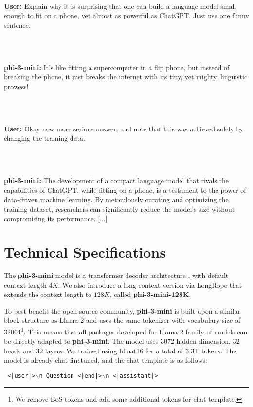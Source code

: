 \begin{AIbox}{}
\tt \footnotesize 
\begin{minipage}[t]{0.99\linewidth}
\textbf{User:} Explain why it is surprising that one can build a language model small enough to fit on a phone, yet almost as powerful as ChatGPT. Just use one funny sentence.
\end{minipage}
\\ \\
\begin{minipage}[t]{0.99\linewidth}
\textbf{phi-3-mini:} It's like fitting a supercomputer in a flip phone, but instead of breaking the phone, it just breaks the internet with its tiny, yet mighty, linguistic prowess!
\end{minipage}
\\ \\
\begin{minipage}[t]{0.99\linewidth}
\textbf{User:}  Okay now more serious answer, and note that this was achieved solely by changing the training data.
\end{minipage}
\\ \\
\begin{minipage}[t]{0.99\linewidth}
\textbf{phi-3-mini:} The development of a compact language model that rivals the capabilities of ChatGPT, while fitting on a phone, is a testament to the power of data-driven machine learning. By meticulously curating and optimizing the training dataset, researchers can significantly reduce the model's size without compromising its performance. [...]
\end{minipage}
\end{AIbox}

\section{Technical Specifications}
The \textbf{phi-3-mini} model is a transformer decoder architecture \cite{Vas17}, with default context length $4K$. We also introduce a long context version via LongRope \cite{ding2024longrope} that extends the context length to $128K$, called \textbf{phi-3-mini-128K}. 

To best benefit the open source community, \textbf{phi-3-mini} is built upon a similar block structure as Llama-2 \cite{touvron2023llama} and uses the same tokenizer with vocabulary size of 32064\footnote{We remove BoS tokens and add some additional tokens for chat template.}. {This means that all packages developed for Llama-2 family of models can be directly adapted to \textbf{phi-3-mini}}. The model uses $3072$ hidden dimension, $32$ heads and $32$ layers. We trained using bfloat16 for a total of 3.3T tokens. The model is already chat-finetuned, and the chat template is as follows:
\begin{AIbox}{}
\tt \footnotesize 
<|user|>$\backslash$n
Question
<|end|>$\backslash$n
<|assistant|>
\end{AIbox}

